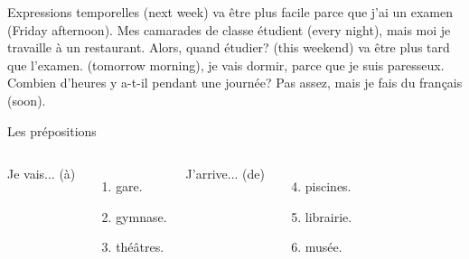 \documentclass{beamer}
\begin{document}
  \begin{frame}{Expressions temporelles }
    \underline{} (next week) va être plus facile parce que j'ai un examen \underline{} (Friday afternoon).
    Mes camarades de classe étudient \underline{} (every night), mais moi je travaille à un restaurant.
    Alors, quand étudier?
    \underline{} (this weekend) va être plus tard que l'examen.
    \underline{} (tomorrow morning), je vais dormir, parce que je suis paresseux.
    Combien d'heures y a-t-il pendant une journée?
    Pas assez, mais je fais du français \underline{} (soon).
  \end{frame}

  \begin{frame}{Les prépositions }
    \begin{columns}
        Je vais... (à)
        \begin{enumerate}
          \item \underline{} gare.
          \item \underline{} gymnase.
          \item \underline{} théâtres.
        \end{enumerate}
        J'arrive... (de)
        \begin{enumerate}
          \setcounter{enumi}{3}
          \item \underline{} piscines.
          \item \underline{} librairie.
          \item \underline{} musée.
        \end{enumerate}
        \begin{minipage}[c][0.6\textheight]{\linewidth}
          \begin{center}
          \end{center}
        \end{minipage}
    \end{columns}
  \end{frame}
\end{document}
